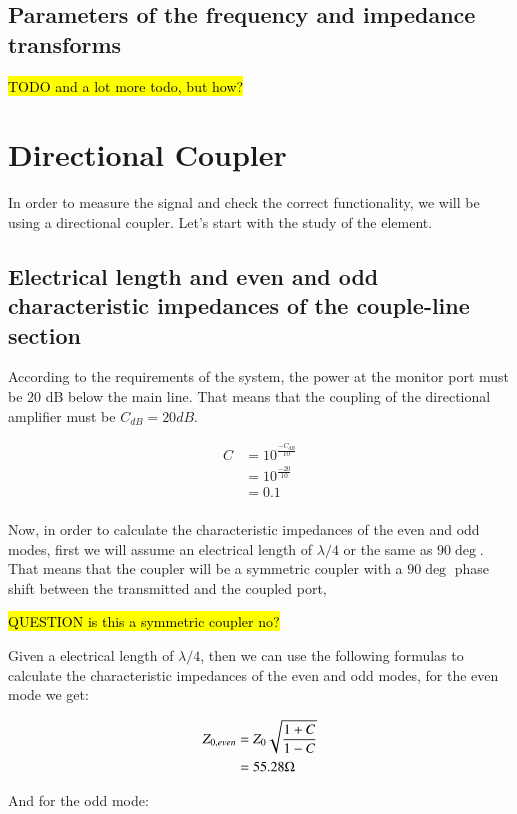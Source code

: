 \documentclass[12pt]{report} %
\newcommand{\question}[1]{\sethlcolor{red}\hl{QUESTION #1}}
\newcommand{\todo}[1]{\sethlcolor{green}\hl{TODO #1}}
\begin{document}
\subsection{Parameters of the frequency and impedance transforms}

\todo{and a lot more todo, but how?}

\section{Directional Coupler}

In order to measure the signal and check the correct functionality, we will be using a directional coupler. Let's start with the study of the element.

\subsection{Electrical length and even and odd characteristic impedances of the couple-line section}

According to the requirements of the system, the power at the monitor port must be 20 dB below the main line. That means that the coupling of the directional amplifier must be $C_{dB} = 20 dB$.

\begin{align*}
C &= 10^{\frac{- C_{dB}}{10}} \\
&= 10^{\frac{- 20}{10}} \\
&= 0.1 \\
\end{align*}

Now, in order to calculate the characteristic impedances of the even and odd modes, first we will assume an electrical length of $\lambda / 4$ or the same as $90 \deg$. That means that the coupler will be a symmetric coupler with a $90 \deg$ phase shift between the transmitted and the coupled port,

\question{is this a symmetric coupler no?}

Given a electrical length of $\lambda / 4$, then we can use the following formulas to calculate the characteristic impedances of the even and odd modes, for the even mode we get:

\begin{align*}
Z_{0, even} &= Z_{0} \* \sqrt{\frac{1 + C}{1 - C}} \\
&= 55.28 \Omega \\
\end{align*}

And for the odd mode:
\end{document}
